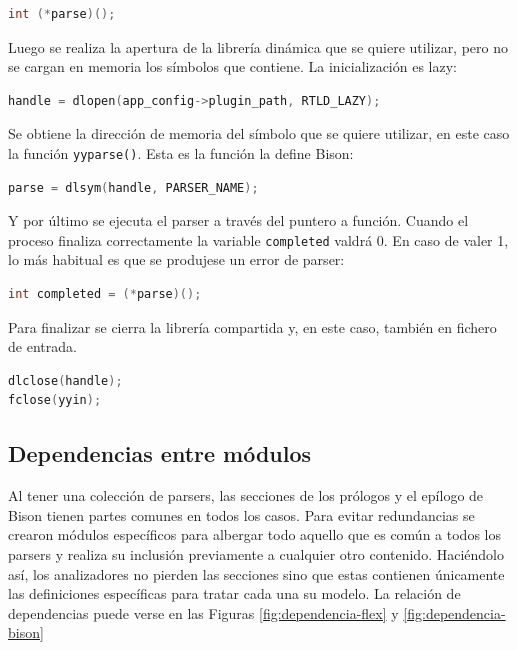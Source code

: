 \begin{lstlisting}[language=C,caption={},label={}]
int (*parse)();
\end{lstlisting}

Luego se realiza la apertura de la librería dinámica que se quiere utilizar, pero no se cargan en memoria los símbolos que contiene. La inicialización es lazy:

\begin{lstlisting}[language=C,caption={},label={}]
handle = dlopen(app_config->plugin_path, RTLD_LAZY);
\end{lstlisting}

Se obtiene la dirección de memoria del símbolo que se quiere utilizar, en este caso la función \verb|yyparse()|. Esta es la función la define Bison:

\begin{lstlisting}[language=C,caption={},label={}]
parse = dlsym(handle, PARSER_NAME);
\end{lstlisting}

Y por último se ejecuta el parser a través del puntero a función. Cuando el proceso finaliza correctamente la variable \verb|completed| valdrá 0. En caso de valer 1, lo más habitual es que se produjese un error de parser:

\begin{lstlisting}[language=C,caption={},label={}]
int completed = (*parse)();
\end{lstlisting}

Para finalizar se cierra la librería compartida y, en este caso, también en fichero de entrada.

\begin{lstlisting}[language=C,caption={},label={}]
dlclose(handle);
fclose(yyin);
\end{lstlisting}

\subsection{Dependencias entre módulos}

Al tener una colección de parsers, las secciones de los prólogos y el epílogo de Bison tienen partes comunes en todos los casos. Para evitar redundancias se crearon módulos específicos para albergar todo aquello que es común a todos los parsers y realiza su inclusión previamente a cualquier otro contenido. Haciéndolo así, los analizadores no pierden las secciones sino que estas contienen únicamente las definiciones específicas para tratar cada una su modelo. La relación de dependencias puede verse en las Figuras \ref{fig:dependencia-flex} y \ref{fig:dependencia-bison}

